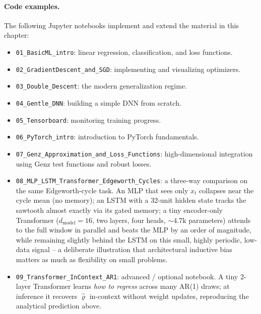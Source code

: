 \documentclass[11pt,a4paper]{report}
\begin{document}
\paragraph{Code examples.}
The following Jupyter notebooks implement and extend the material in this chapter:
\begin{itemize}[itemsep=2pt]
\item \texttt{01\_BasicML\_intro}: linear regression, classification, and loss functions.
\item \texttt{02\_GradientDescent\_and\_SGD}: implementing and visualizing optimizers.
\item \texttt{03\_Double\_Descent}: the modern generalization regime.
\item \texttt{04\_Gentle\_DNN}: building a simple DNN from scratch.
\item \texttt{05\_Tensorboard}: monitoring training progress.
\item \texttt{06\_PyTorch\_intro}: introduction to PyTorch fundamentals.
\item \texttt{07\_Genz\_Approximation\_and\_Loss\_Functions}: high-dimensional integration using Genz test functions and robust losses.
\item \texttt{08\_MLP\_LSTM\_Transformer\_Edgeworth\_Cycles}: a three-way comparison on the same Edgeworth-cycle task.  An MLP that sees only $x_t$ collapses near the cycle mean (no memory); an LSTM with a 32-unit hidden state tracks the sawtooth almost exactly via its gated memory; a tiny encoder-only Transformer ($d_{\text{model}}\!=\!16$, two layers, four heads, $\sim\!4.7$k parameters) attends to the full window in parallel and beats the MLP by an order of magnitude, while remaining slightly behind the LSTM on this small, highly periodic, low-data signal -- a deliberate illustration that architectural inductive bias matters as much as flexibility on small problems.
\item \texttt{09\_Transformer\_InContext\_AR1}: advanced / optional notebook.  A tiny 2-layer Transformer learns \emph{how to regress} across many AR(1) draws; at inference it recovers $\hat{\varrho}$ in-context without weight updates, reproducing the analytical prediction above.
\end{itemize}
\end{document}
